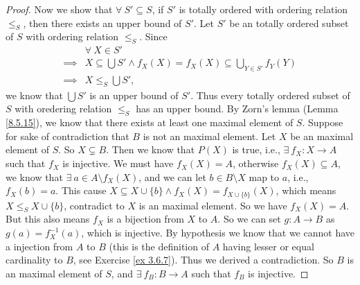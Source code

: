 \begin{proof}
    Now we show that \(\forall\ S' \subseteq S\), if \(S'\) is totally ordered with ordering relation \(\leq_S\), then there exists an upper bound of \(S'\).
    Let \(S'\) be an totally ordered subset of \(S\) with ordering relation \(\leq_S\).
    Since
    \begin{align*}
                 & \forall\ X \in S'                                                                \\
        \implies & X \subseteq \bigcup S' \land f_X(X) = f_X(X) \subseteq \bigcup_{Y \in S'} f_Y(Y) \\
        \implies & X \leq_S \bigcup S',
    \end{align*}
    we know that \(\bigcup S'\) is an upper bound of \(S'\).
    Thus every totally ordered subset of \(S\) with oredering relation \(\leq_S\) has an upper bound.
    By Zorn's lemma (Lemma \ref{8.5.15}), we know that there exists at least one maximal element of \(S\).
    Suppose for sake of contradiction that \(B\) is not an maximal element.
    Let \(X\) be an maximal element of \(S\).
    So \(X \subsetneq B\).
    Then we know that \(P(X)\) is true, i.e., \(\exists\ f_X : X \to A\) such that \(f_X\) is injective.
    We must have \(f_X(X) = A\), otherwise \(f_X(X) \subseteq A\), we know that \(\exists\ a \in A \setminus f_X(X)\), and we can let \(b \in B \setminus X\) map to \(a\), i.e., \(f_X(b) = a\).
    This cause \(X \subseteq X \cup \{b\} \land f_X(X) = f_{X \cup \{b\}}(X)\), which means \(X \leq_S X \cup \{b\}\), contradict to \(X\) is an maximal element.
    So we have \(f_X(X) = A\).
    But this also means \(f_X\) is a bijection from \(X\) to \(A\).
    So we can set \(g : A \to B\) as \(g(a) = f_X^{-1}(a)\), which is injective.
    By hypothesis we know that we cannot have a injection from \(A\) to \(B\) (this is the definition of \(A\) having lesser or equal cardinality to \(B\), see Exercise \ref{ex 3.6.7}).
    Thus we derived a contradiction.
    So \(B\) is an maximal element of \(S\), and \(\exists\ f_B : B \to A\) such that \(f_B\) is injective.
\end{proof}

